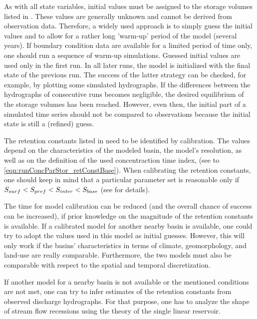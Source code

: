 As with all state variables, initial values must be assigned to the storage volumes listed in . These values are generally unknown and cannot be derived from observation data. Therefore, a widely used approach is to simply guess the initial values and to allow for a rather long 'warm-up' period of the model (several years). If boundary condition data are available for a limited period of time only, one should run a sequence of warm-up simulations. Guessed initial values are used only in the first run. In all later runs, the model is initialized with the final state of the previous run. The success of the latter strategy can be checked, for example, by plotting some simulated hydrographs. If the differences between the hydrographs of consecutive runs becomes negligible, the desired equilibrium of the storage volumes has been reached. However, even then, the initial part of a simulated time series should not be compared to observations because the initial state is still a (refined) guess.

The retention constants listed in  need to be identified by calibration. The values depend on the characteristics of the modeled basin, the model's resolution, as well as on the definition of the used concentraction time index, \concTimeIndex{} (see  to \ref{eqn:runConcParStor_retConstBase}). When calibrating the retention constants, one should keep in mind that a particular parameter set is reasonable only if ${S_{surf}} < {S_{pref}} < {S_{inter}} < {S_{base}}$ (see  for details).

The time for model calibration can be reduced (and the overall chance of success can be increased), if prior knowledge on the magnitude of the retention constants is available. If a calibrated model for another nearby basin is available, one could try to adopt the values used in this model as initial guesses. However, this will only work if the basins' characteristics in terms of climate, geomorphology, and land-use are really comparable. Furthermore, the two models must also be comparable with respect to the spatial and temporal discretization.

If another model for a nearby basin is not available or the mentioned conditions are not met, one can try to infer estimates of the retention constants from observed discharge hydrographs. For that purpose, one has to analyze the shape of stream flow recessions using the theory of the single linear reservoir.

